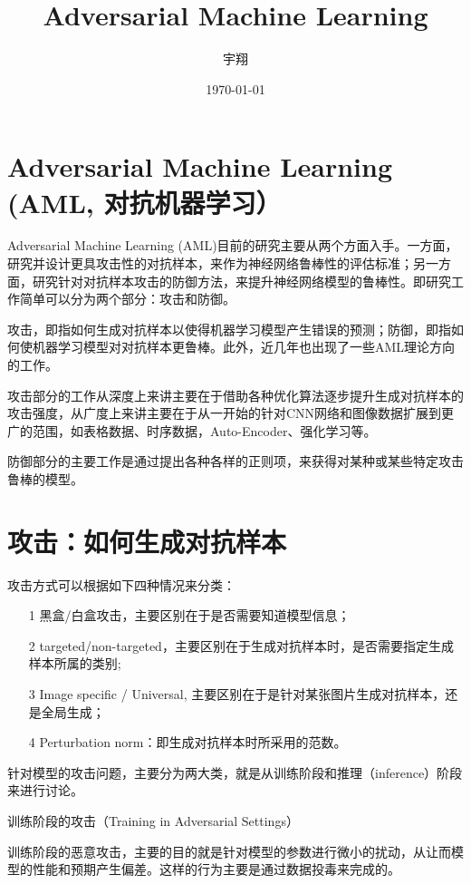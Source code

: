 \documentclass[UTF8]{ctexart}
\title{\heiti Adversarial Machine Learning}
\author{\kaishu 宇翔}
\date{\today}
\begin{document}
    
    \maketitle

    \clearpage
    \section{Adversarial Machine Learning (AML, 对抗机器学习）}\label{sec:diyijie}
	Adversarial Machine Learning (AML)目前的研究主要从两个方面入手。一方面，研究并设计更具攻击性的对抗样本，来作为神经网络鲁棒性的评估标准；另一方面，研究针对对抗样本攻击的防御方法，来提升神经网络模型的鲁棒性。即研究工作简单可以分为两个部分：攻击和防御。

	攻击，即指如何生成对抗样本以使得机器学习模型产生错误的预测；防御，即指如何使机器学习模型对对抗样本更鲁棒。此外，近几年也出现了一些AML理论方向的工作。

	攻击部分的工作从深度上来讲主要在于借助各种优化算法逐步提升生成对抗样本的攻击强度，从广度上来讲主要在于从一开始的针对CNN网络和图像数据扩展到更广的范围，如表格数据、时序数据，Auto-Encoder、强化学习等。

	防御部分的主要工作是通过提出各种各样的正则项，来获得对某种或某些特定攻击鲁棒的模型。
	\clearpage

    \section{攻击：如何生成对抗样本}\label{sec:dierjie}
	攻击方式可以根据如下四种情况来分类：
	\begin{itemize}
	\item[1] 黑盒/白盒攻击，主要区别在于是否需要知道模型信息；
	\item[2] targeted/non-targeted，主要区别在于生成对抗样本时，是否需要指定生成样本所属的类别;
	\item[3] Image specific / Universal, 主要区别在于是针对某张图片生成对抗样本，还是全局生成；
	\item[4] Perturbation norm：即生成对抗样本时所采用的范数。
	\end{itemize}

	针对模型的攻击问题，主要分为两大类，就是从训练阶段和推理（inference）阶段来进行讨论。

	训练阶段的攻击（Training in Adversarial Settings）

	训练阶段的恶意攻击，主要的目的就是针对模型的参数进行微小的扰动，从让而模型的性能和预期产生偏差。这样的行为主要是通过数据投毒来完成的。
\end{document}
